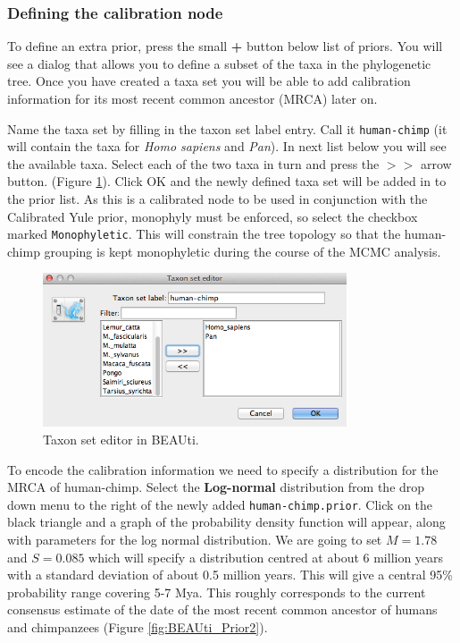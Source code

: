 \documentclass[11pt]{article}
\theoremstyle{plain}%
\theoremstyle{definition}
\theoremstyle{remark}
\begin{document}

\subsubsection{Defining the calibration node}

To define an extra prior, press the small {\bf +} button below list of priors. You will see a
dialog that allows you to define a subset of the taxa in the phylogenetic tree. Once you have created a taxa set you will be able to add calibration information for its most recent common
ancestor (MRCA) later on. 

Name the taxa set by filling in the taxon set label entry. 
Call it \texttt{human-chimp} (it will contain the taxa for {\it Homo sapiens} and {\it Pan}).
In next list below you will see the available taxa. Select each of the two taxa in turn and press the $> >$ arrow button. (Figure \ref{fig:BEAUti_TaxonSets}).
Click OK and the newly defined taxa set will be added in to the prior list.
As this is a calibrated node to be used in conjunction with the Calibrated Yule prior, monophyly must be enforced, so select the checkbox marked \texttt{Monophyletic}. This will constrain the tree topology so that the human-chimp grouping is kept monophyletic during the course of the MCMC analysis.

\begin{figure}
\centering
\includegraphics[width=9cm]{figures/BEAUti_TaxonSets}
\caption{Taxon set editor in BEAUti.}
\label{fig:BEAUti_TaxonSets}
\end{figure}

To encode the calibration information we need to specify a distribution for the MRCA of human-chimp.
Select the \textbf{Log-normal} distribution from the drop down menu to the right of the newly added \texttt{human-chimp.prior}. 
Click on the black triangle and a graph of the probability density function will appear, along with parameters for the log normal distribution.
We are going to set $M=1.78$ and $S=0.085$ which will specify a distribution centred at about 6 million
years with a standard deviation of about 0.5 million years. This will give
a central 95\% probability range covering 5-7 Mya. This roughly corresponds to the current consensus
estimate of the date of the most recent common ancestor of humans and chimpanzees (Figure \ref{fig:BEAUti_Prior2}).
\end{document}
